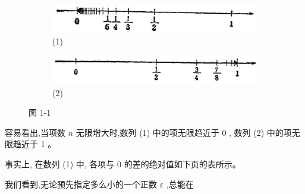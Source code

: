 \documentclass[lang=cn,newtx,12pt,scheme=chinese]{elegantbook}
\begin{document}
\begin{figure}[h]
	\centering
	\begin{subfigure}[h]{0.45\textwidth}
		\centering
		\includegraphics[max width=\textwidth]{images/01912c18-5c3f-733d-b775-749ba9897a9d_4_159408.jpg}
%		
		\caption{(1)}
	\end{subfigure}
	\hfill %
	\begin{subfigure}[h]{0.45\textwidth}
		\centering
		\includegraphics[max width=\textwidth]{images/01912c18-5c3f-733d-b775-749ba9897a9d_4_459236.jpg}
%		
		\caption{(2)}
	\end{subfigure}
	\caption{图 1-1}
\end{figure}

容易看出,当项数 \(n\) 无限增大时,数列 (1) 中的项无限趋近于 0 , 数列 (2) 中的项无限趋近于 1 。

事实上, 在数列 (1) 中, 各项与 0 的差的绝对值如下页的表所示。

我们看到,无论预先指定多么小的一个正数 \(\varepsilon\) ,总能在

\begin{center}
\end{center}
\end{document}
